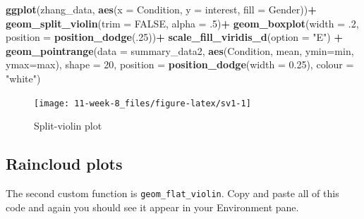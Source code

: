 \documentclass[]{book}
\newenvironment{Shaded}{\begin{snugshade}}{\end{snugshade}}
\newcommand{\DataTypeTok}[1]{\textcolor[rgb]{0.13,0.29,0.53}{#1}}
\newcommand{\DecValTok}[1]{\textcolor[rgb]{0.00,0.00,0.81}{#1}}
\newcommand{\FloatTok}[1]{\textcolor[rgb]{0.00,0.00,0.81}{#1}}
\newcommand{\KeywordTok}[1]{\textcolor[rgb]{0.13,0.29,0.53}{\textbf{#1}}}
\newcommand{\NormalTok}[1]{#1}
\newcommand{\OperatorTok}[1]{\textcolor[rgb]{0.81,0.36,0.00}{\textbf{#1}}}
\newcommand{\OtherTok}[1]{\textcolor[rgb]{0.56,0.35,0.01}{#1}}
\newcommand{\StringTok}[1]{\textcolor[rgb]{0.31,0.60,0.02}{#1}}
\begin{document}
\begin{Shaded}
\begin{Highlighting}[]
\KeywordTok{ggplot}\NormalTok{(zhang_data, }\KeywordTok{aes}\NormalTok{(}\DataTypeTok{x =}\NormalTok{ Condition, }\DataTypeTok{y =}\NormalTok{ interest, }\DataTypeTok{fill =}\NormalTok{ Gender))}\OperatorTok{+}
\StringTok{  }\KeywordTok{geom_split_violin}\NormalTok{(}\DataTypeTok{trim =} \OtherTok{FALSE}\NormalTok{, }\DataTypeTok{alpha =} \FloatTok{.5}\NormalTok{)}\OperatorTok{+}
\StringTok{  }\KeywordTok{geom_boxplot}\NormalTok{(}\DataTypeTok{width =} \FloatTok{.2}\NormalTok{, }\DataTypeTok{position =} \KeywordTok{position_dodge}\NormalTok{(.}\DecValTok{25}\NormalTok{))}\OperatorTok{+}
\StringTok{  }\KeywordTok{scale_fill_viridis_d}\NormalTok{(}\DataTypeTok{option =} \StringTok{"E"}\NormalTok{) }\OperatorTok{+}
\StringTok{  }\KeywordTok{geom_pointrange}\NormalTok{(}\DataTypeTok{data =}\NormalTok{ summary_data2,}
                  \KeywordTok{aes}\NormalTok{(Condition, mean, }\DataTypeTok{ymin=}\NormalTok{min, }\DataTypeTok{ymax=}\NormalTok{max),}
                  \DataTypeTok{shape =} \DecValTok{20}\NormalTok{, }
                  \DataTypeTok{position =} \KeywordTok{position_dodge}\NormalTok{(}\DataTypeTok{width =} \FloatTok{0.25}\NormalTok{),}
                  \DataTypeTok{colour =} \StringTok{"white"}\NormalTok{)}
\end{Highlighting}
\end{Shaded}

\begin{figure}

{\centering \texttt{[image: 11-week-8\_files/figure-latex/sv1-1]} 

}

\caption{Split-violin plot}\label{fig:sv1}
\end{figure}

\hypertarget{raincloud-plots}{%
\subsection{Raincloud plots}\label{raincloud-plots}}

The second custom function is \texttt{geom\_flat\_violin}. Copy and paste all of this code and again you should see it appear in your Environment pane.
\end{document}
